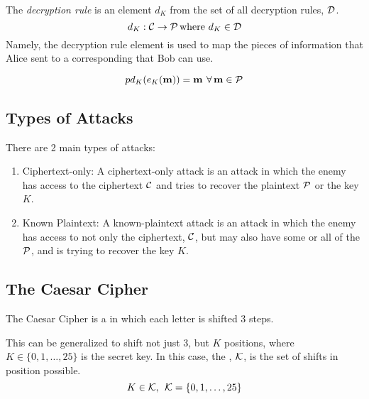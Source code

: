 \begin{definition}\label{def:Decryption_Rule}
  The \emph{decryption rule} is an element $d_{K}$ from the set of all decryption rules, $\operatorname{\mathcal{D}}$.
  \begin{equation}\label{eq:Decryption_Rule}
    d_{K} : \operatorname{\mathcal{C}} \rightarrow \operatorname{\mathcal{P}} \text{where } d_{K} \in \operatorname{\mathcal{D}}
  \end{equation}
  Namely, the decryption rule element is used to map the  pieces of information that Alice sent to a corresponding  that Bob can use.

  \begin{remark}
    \begin{equation}\label{eq:Decrypt_Encryption}
p      d_{K}(e_{K}(\operatorname{\mathbf{m}})) = \operatorname{\mathbf{m}} \: \forall \operatorname{\mathbf{m}} \in \operatorname{\mathcal{P}}
    \end{equation}
  \end{remark}
\end{definition}

\subsection{Types of Attacks}\label{subsec:Attack_Types}
There are 2 main types of attacks:
\begin{enumerate}[noitemsep]
\item Ciphertext-only: A ciphertext-only attack is an attack in which the enemy has access to the ciphertext $\operatorname{\mathcal{C}}$ and tries to recover the plaintext $\operatorname{\mathcal{P}}$ or the key $K$.
\item Known Plaintext: A known-plaintext attack is an attack in which the enemy has access to not only the ciphertext, $\operatorname{\mathcal{C}}$, but may also have some or all of the $\operatorname{\mathcal{P}}$, and is trying to recover the key $K$.
\end{enumerate}

\subsection{The Caesar Cipher}\label{subsec:The_Caesar_Cipher}
The Caesar Cipher is a  in which each letter is shifted 3 steps.

This can be generalized to shift not just 3, but $K$ positions, where $K \in \lbrace 0, 1, \ldots, 25 \rbrace$ is the secret key.
In this case, the , $\operatorname{\mathcal{K}}$, is the set of shifts in position possible.
\begin{equation*}
  K \in \operatorname{\mathcal{K}}, \:\: \operatorname{\mathcal{K}} = \lbrace 0, 1, \ldots, 25 \rbrace
\end{equation*}

